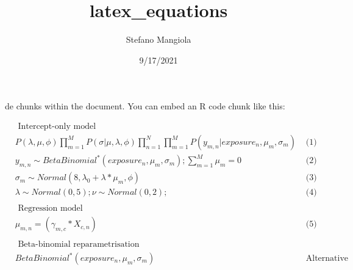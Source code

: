 \documentclass[
]{article}
\title{latex\_equations}
\author{Stefano Mangiola}
\date{9/17/2021}
\begin{document}
\maketitle

de chunks within the document. You can embed an R code chunk like this:

\begin{align}

& \textrm{ Intercept-only model } \\

& P\left ( \lambda, \mu, \phi \right ) \prod_{m=1}^{M} P\left ( \sigma | \mu, \lambda, \phi \right ) 
 \prod_{n=1}^{N} \prod_{m=1}^{M} P\left ( y_{m,n} | exposure_{n}, \mu_{m}, \sigma_{m} \right ) & \textrm{ (1) } \\

& y_{m,n} \sim \mathit{BetaBinomial^{*}} \left(exposure_{n}, \mu_{m}, \sigma_{m} \right ); \sum_{m=1}^{M} \mu_{m} = 0 & \textrm{ (2) } \\

& \sigma_{m} \sim \mathit{Normal} \left(8, \lambda_{0} + \lambda * \mu_{m}, \phi \right ) & \textrm{ (3) } \\

& \lambda \sim \mathit{Normal} \left(0,5 \right);  \nu \sim \mathit{Normal} \left(0,2 \right); & \textrm{ (4) }  \\
\\
& \textrm{ Regression model } \\

& \mu_{m,n} =  \left( \gamma_{m,c} * X_{c,n} \right ) & \textrm{ (5) } \\
\\

& \textrm{ Beta-binomial reparametrisation } \\
& \mathit{BetaBinomial^{*}} \left(exposure_{n}, \mu_{m}, \sigma_{m} \right ) & \textrm{ Alternative parametrisation (6) } \\



\end{align}
\end{document}
